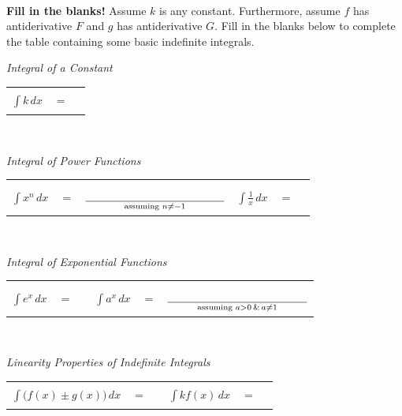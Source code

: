 \documentclass[10pt]{article}
\begin{document}
\

\newpage%

\begin{center}
\end{center}

{\bf\color{blue} Fill in the blanks!} Assume $k$ is any constant. Furthermore, assume $f$ has antiderivative $F$ and $g$ has antiderivative $G$. Fill in the blanks below to complete the table containing some basic indefinite integrals.

\begin{center}
{\it Integral of a Constant}\\[0.1in]
\begin{tabular}{ r c l}
$\displaystyle\int k\, dx$ & $=$ & \rule[-8pt]{1.75in}{0.4pt}
\end{tabular}
\end{center}

\

\begin{center}
{\it Integral of Power Functions}\\[0.1in]
\begin{tabular}{ r c l r c l}
$\displaystyle\int x^n\, dx$ & ${=}$ & $\underset{\text{assuming }n\not=-1}{\rule[-8pt]{1.75in}{0.4pt}}$ & $\displaystyle\int\frac1x\,dx$ & $=$ & \rule[-8pt]{1.75in}{0.4pt}\\[0.1in]
\end{tabular}
\end{center}

\

\begin{center}
{\it Integral of Exponential Functions}\\[0.1in]
\begin{tabular}{ r c l r c l}
$\displaystyle\int e^x\, dx$ & $=$ & \rule[-8pt]{1.75in}{0.4pt} & $\displaystyle\int a^x\,dx$ & $=$ & $\underset{\text{assuming }a>0\,\&\,a\not=1}{\rule[-8pt]{1.75in}{0.4pt}}$\\[0.1in]
\end{tabular}
\end{center}

\

\begin{center}
{\it Linearity Properties of Indefinite Integrals}\\[0.1in]
\begin{tabular}{ r c l r c l}
$\displaystyle\int \big( f(x) \pm g(x) \big)\, dx$ & $=$ & \rule[-8pt]{1.75in}{0.4pt} & $\displaystyle\int kf(x) \,dx$ & $=$ & \rule[-8pt]{1.75in}{0.4pt}\\[0.1in]
\end{tabular}
\end{center}
\end{document}
